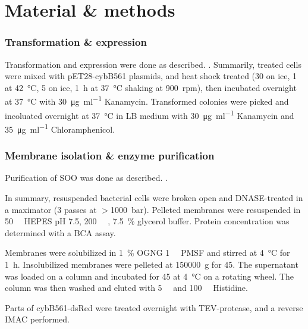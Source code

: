\documentclass[a4paper,overfullrule=true]{scrartcl}
\begin{document}

\newpage
\part*{Material \& methods}

\section{Transformation \& expression}

Transformation and expression were done as described.
\cite{superoxide_salvaging}. Summarily,  treated cells were mixed
with pET28-cybB561 plasmids, and heat shock treated (\SI{30}{\min} on ice,
\SI{1}{\min} at \SI{42}{\celsius}, \SI{5}{\min} on ice, \SI{1}{\hour} at
\SI{37}{\celsius} shaking at \SI{900}{rpm}), then incubated overnight at
\SI{37}{\celsius} with \SI{30}{\ug\per\ml} Kanamycin. Transformed colonies were
picked and incoluated overnight at \SI{37}{\celsius} in LB medium with
\SI{30}{\ug\per\ml} Kanamycin and \SI{35}{\ug\per\ml} Chloramphenicol.


\section{Membrane isolation \& enzyme purification}

Purification of SOO was done as described. \cite{superoxide_salvaging}.

In summary, resuspended bacterial cells were broken open and DNASE-treated in a
maximator (3 passes at $>$\SI{1000}{\bar}). Pelleted membranes were resuspended
in \SI{50}{\milli\Molar} HEPES pH 7.5, \SI{200}{\milli\Molar} ,
\SI{7.5}{\percent} glycerol buffer. Protein concentration was determined with a
BCA assay.

Membranes were solubilized in \SI{1}{\percent} OGNG \SI{1}{\milli\Molar} PMSF
and stirred at \SI{4}{\celsius} for \SI{1}{\hour}. Insolubilized membranes were
pelleted at \SI{150000}{g} for \SI{45}{\min}. The supernatant was loaded on a
 column and incubated for \SI{45}{\min} at \SI{4}{\celsius} on a
rotating wheel. The column was then washed and eluted with \SI{5}{\milli\Molar}
and \SI{100}{\milli\Molar} Histidine.

Parts of cybB561-dsRed were treated overnight with TEV-protease, and a reverse
 IMAC performed.
\end{document}
